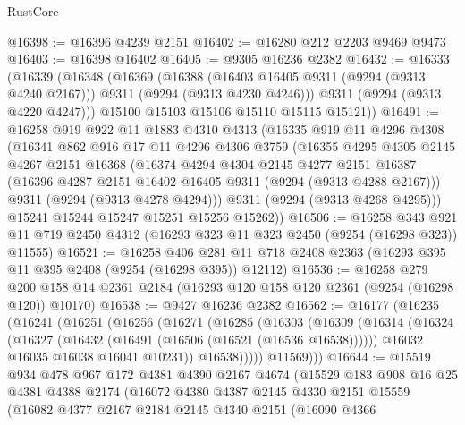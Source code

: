 \begin{lexlean}{RustCore}
\begin{coremodule}
@16398 := @16396 @4239 @2151
@16402 := @16280 @212 @2203 @9469 @9473
@16403 := @16398 @16402
@16405 := @9305 @16236 @2382
@16432 := @16333
    (@16339
      (@16348
        (@16369
          (@16388
            (@16403 @16405 @9311 (@9294 (@9313 @4240 @2167)))
            @9311
            (@9294 (@9313 @4230 @4246)))
          @9311
          (@9294 (@9313 @4220 @4247)))
        @15100
        @15103
        @15106
        @15110
        @15115
        @15121))
@16491 := @16258
    @919
    @922
    @11
    @1883
    @4310
    @4313
    (@16335
      @919
      @11
      @4296
      @4308
      (@16341
        @862
        @916
        @17
        @11
        @4296
        @4306
        @3759
        (@16355
          @4295
          @4305
          @2145
          @4267
          @2151
          @16368
          (@16374
            @4294
            @4304
            @2145
            @4277
            @2151
            @16387
            (@16396 @4287 @2151 @16402 @16405 @9311 (@9294 (@9313 @4288 @2167)))
            @9311
            (@9294 (@9313 @4278 @4294)))
          @9311
          (@9294 (@9313 @4268 @4295)))
        @15241
        @15244
        @15247
        @15251
        @15256
        @15262))
@16506 := @16258
    @343
    @921
    @11
    @719
    @2450
    @4312
    (@16293 @323 @11 @323 @2450 (@9254 (@16298 @323)) @11555)
@16521 := @16258
    @406
    @281
    @11
    @718
    @2408
    @2363
    (@16293 @395 @11 @395 @2408 (@9254 (@16298 @395)) @12112)
@16536 := @16258
    @279
    @200
    @158
    @14
    @2361
    @2184
    (@16293 @120 @158 @120 @2361 (@9254 (@16298 @120)) @10170)
@16538 := @9427 @16236 @2382
@16562 := @16177
    (@16235
      (@16241
        (@16251
          (@16256
            (@16271
              (@16285
                (@16303
                  (@16309
                    (@16314
                      (@16324
                        (@16327 (@16432 (@16491 (@16506 (@16521 (@16536 @16538))))))
                        @16032
                        @16035
                        @16038
                        @16041
                        @10231))
                    @16538)))))
          @11569)))
@16644 := @15519
    @934
    @478
    @967
    @172
    @4381
    @4390
    @2167
    @4674
    (@15529
      @183
      @908
      @16
      @25
      @4381
      @4388
      @2174
      (@16072
        @4380
        @4387
        @2145
        @4330
        @2151
        @15559
        (@16082
          @4377
          @2167
          @2184
          @2145
          @4340
          @2151
          (@16090
            @4366

\end{coremodule}
\end{lexlean}
